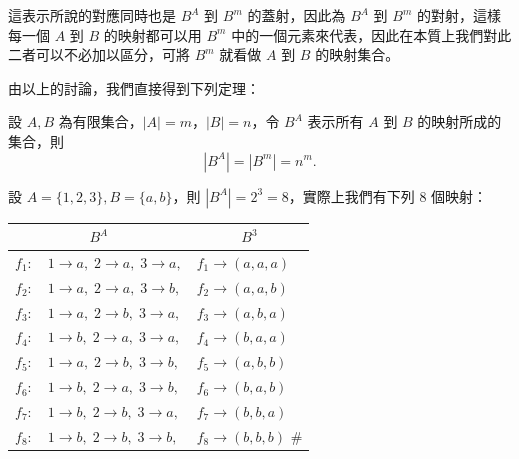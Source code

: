 這表示所說的對應同時也是 $B^A$ 到 $B^m$ 的蓋射，因此為 $B^A$ 到 $B^m$ 的對射，這樣每一個 $A$ 到 $B$ 的映射都可以用 $B^m$ 中的一個元素來代表，因此在本質上我們對此二者可以不必加以區分，可將 $B^m$ 就看做 $A$ 到 $B$ 的映射集合。

由以上的討論，我們直接得到下列定理：

\medskip
\begin{theorem}\label{thm:b5-2-2}
設 $A, B$ 為有限集合，$|A| = m$，$|B| = n$，令 $B^A$ 表示所有 $A$ 到 $B$ 的映射所成的集合，則
\begin{equation}
|B^A| = |B^m| = n^m. \tag{8}
\end{equation}
\end{theorem}

\medskip
\begin{discussion}\label{disc:b5-2-1}
設 $A=\{1, 2, 3\}, B=\{a, b\}$，則 $|B^A| = 2^3 = 8$，實際上我們有下列 8 個映射：

\begin{center}
\renewcommand{\arraystretch}{1.2}
\begin{tabular}{r@{\quad}l@{\quad}|@{\quad}l}
\multicolumn{2}{c|}{$B^A$} & \multicolumn{1}{c}{$B^3$} \\ \hline
$f_1 :$ & $1 \longrightarrow a,\; 2 \longrightarrow a,\; 3 \longrightarrow a,$ & $f_1 \longrightarrow (a, a, a)$ \\
$f_2 :$ & $1 \longrightarrow a,\; 2 \longrightarrow a,\; 3 \longrightarrow b,$ & $f_2 \longrightarrow (a, a, b)$ \\
$f_3 :$ & $1 \longrightarrow a,\; 2 \longrightarrow b,\; 3 \longrightarrow a,$ & $f_3 \longrightarrow (a, b, a)$ \\
$f_4 :$ & $1 \longrightarrow b,\; 2 \longrightarrow a,\; 3 \longrightarrow a,$ & $f_4 \longrightarrow (b, a, a)$ \\
$f_5 :$ & $1 \longrightarrow a,\; 2 \longrightarrow b,\; 3 \longrightarrow b,$ & $f_5 \longrightarrow (a, b, b)$ \\
$f_6 :$ & $1 \longrightarrow b,\; 2 \longrightarrow a,\; 3 \longrightarrow b,$ & $f_6 \longrightarrow (b, a, b)$ \\
$f_7 :$ & $1 \longrightarrow b,\; 2 \longrightarrow b,\; 3 \longrightarrow a,$ & $f_7 \longrightarrow (b, b, a)$ \\
$f_8 :$ & $1 \longrightarrow b,\; 2 \longrightarrow b,\; 3 \longrightarrow b,$ & $f_8 \longrightarrow (b, b, b)$ \hfill $\#$
\end{tabular}
\end{center}
\end{discussion}

